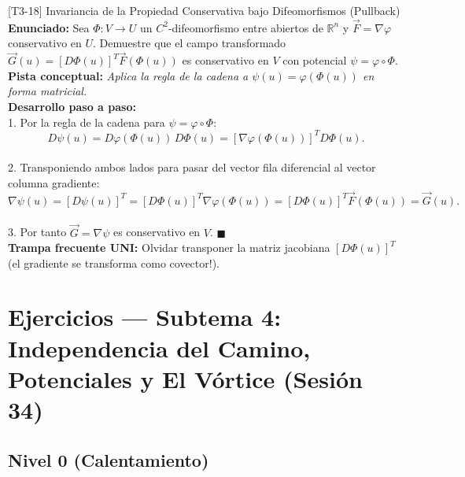\documentclass[11pt,a4paper]{article}
\begin{document}
\begin{ejerciciobox}{[T3-18] Invariancia de la Propiedad Conservativa bajo Difeomorfismos (Pullback)}
\textbf{Enunciado:} Sea $\Phi: V \to U$ un $C^2$-difeomorfismo entre abiertos de $\mathbb{R}^n$ y $\vec{F} = \nabla\varphi$ conservativo en $U$. Demuestre que el campo transformado $\vec{G}(u) = [D\Phi(u)]^T \vec{F}(\Phi(u))$ es conservativo en $V$ con potencial $\psi = \varphi \circ \Phi$.\\[0.2cm]
\textbf{Pista conceptual:} \emph{Aplica la regla de la cadena a $\psi(u) = \varphi(\Phi(u))$ en forma matricial.}\\[0.2cm]
\textbf{Desarrollo paso a paso:}\\
1. Por la regla de la cadena para $\psi = \varphi \circ \Phi$:\\
$$D\psi(u) = D\varphi(\Phi(u))\,D\Phi(u) = [\nabla\varphi(\Phi(u))]^T D\Phi(u).$$\\
2. Transponiendo ambos lados para pasar del vector fila diferencial al vector columna gradiente:\\
$$\nabla\psi(u) = [D\psi(u)]^T = [D\Phi(u)]^T \nabla\varphi(\Phi(u)) = [D\Phi(u)]^T \vec{F}(\Phi(u)) = \vec{G}(u).$$\\
3. Por tanto $\vec{G} = \nabla\psi$ es conservativo en $V$. $\blacksquare$\\[0.2cm]
\textbf{Trampa frecuente UNI:} Olvidar transponer la matriz jacobiana $[D\Phi(u)]^T$ (el gradiente se transforma como covector!).
\end{ejerciciobox}

\section{Ejercicios --- Subtema 4: Independencia del Camino, Potenciales y El Vórtice (Sesión 34)}

\subsection{Nivel 0 (Calentamiento)}
\end{document}
